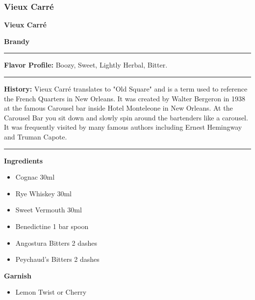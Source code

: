 \subsubsection{Vieux Carré}
\noindent
\begin{minipage}{.49\textwidth}
    \noindent\textbf{\LARGE Vieux Carré}
\end{minipage}
\hspace{.02\textwidth}
\begin{minipage}{.49\textwidth}
    \raggedleft
    \textbf{\large Brandy}\\
\end{minipage}
\vspace{.5em}\hrule\vspace{.5em}
\noindent
\textbf{\large Flavor Profile:} Boozy, Sweet, Lightly Herbal, Bitter.
\vspace{.5em}\hrule\vspace{.5em}
\noindent
\textbf{\large History:} Vieux Carré translates to "Old Square" and is a term used to reference the French Quarters in New Orleans. It was created by Walter Bergeron in 1938 at the famous Carousel bar inside Hotel Monteleone in New Orleans. At the Carousel Bar you sit down and slowly spin around the bartenders like a carousel. It was frequently visited by many famous authors including Ernest Hemingway and Truman Capote.
\vspace{.5em}\hrule\vspace{.5em}
\noindent
\begin{minipage}[t]{.49\textwidth}
    \noindent
    \textbf{\large Ingredients}
    \begin{itemize}
        \item Cognac 30ml
        \item Rye Whiskey 30ml
        \item Sweet Vermouth 30ml
        \item Benedictine 1 bar spoon
        \item Angostura Bitters 2 dashes
        \item Peychaud's Bitters 2 dashes
    \end{itemize}
    \noindent
    \textbf{\large Garnish}
    \begin{itemize}
        \item Lemon Twist or Cherry
    \end{itemize}
\end{minipage}
